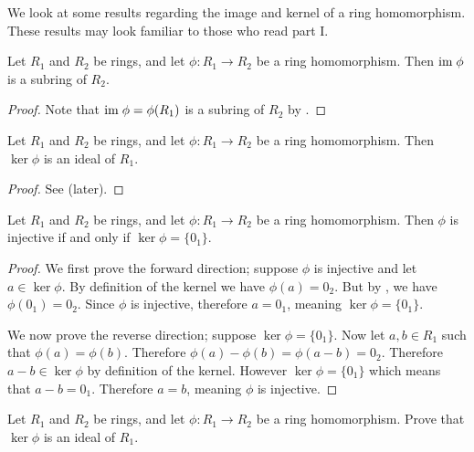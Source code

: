 We look at some results regarding the image and kernel of a ring homomorphism. These results may look familiar to those who read part I.
\begin{proposition}\label{prop-image-is-a-subring}
    Let $R_1$ and $R_2$ be rings, and let $\phi: R_1 \to R_2$ be a ring homomorphism. Then $\mathrm{im}\;\phi$ is a subring of $R_2$.
\end{proposition}
\begin{proof}
    Note that $\mathrm{im}\;\phi = \phi(R_1)$ is a subring of $R_2$ by .
\end{proof}

\begin{proposition}\label{prop-kernel-is-an-ideal}
    Let $R_1$ and $R_2$ be rings, and let $\phi: R_1 \to R_2$ be a ring homomorphism. Then $\ker\phi$ is an ideal of $R_1$.
\end{proposition}
\begin{proof}
    See  (later).
\end{proof}

\begin{proposition}
    Let $R_1$ and $R_2$ be rings, and let $\phi: R_1 \to R_2$ be a ring homomorphism. Then $\phi$ is injective if and only if $\ker\phi = \{0_1\}$.
\end{proposition}
\begin{proof}
    We first prove the forward direction; suppose $\phi$ is injective and let $a \in \ker\phi$. By definition of the kernel we have $\phi(a) = 0_2$. But by , we have $\phi(0_1) = 0_2$. Since $\phi$ is injective, therefore $a = 0_1$, meaning $\ker\phi = \{0_1\}$.

    We now prove the reverse direction; suppose $\ker\phi = \{0_1\}$. Now let $a,b \in R_1$ such that $\phi(a) = \phi(b)$. Therefore $\phi(a) - \phi(b) = \phi(a-b) = 0_2$. Therefore $a-b \in \ker\phi$ by definition of the kernel. However $\ker\phi = \{0_1\}$ which means that $a - b = 0_1$. Therefore $a = b$, meaning $\phi$ is injective.
\end{proof}

\begin{exercise}\label{exercise-kernel-is-an-ideal}
    Let $R_1$ and $R_2$ be rings, and let $\phi: R_1 \to R_2$ be a ring homomorphism. Prove that $\ker\phi$ is an ideal of $R_1$.
\end{exercise}

\newpage

